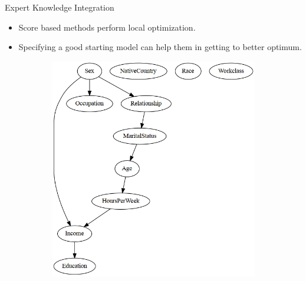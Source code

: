 \documentclass{beamer}
\begin{document}
\begin{frame}{Expert Knowledge Integration}
	\begin{itemize}
		\item Score based methods perform local optimization.
		\item Specifying a good starting model can help them in getting to better 
			optimum.
	\end{itemize}

	\begin{figure}
		\begin{subfigure}{0.5 \textwidth}
		\end{subfigure}%
		\begin{subfigure}{0.5 \textwidth}
			\centering
			\includegraphics[scale=0.3]{imgs/adult_bic_start.png}
		\end{subfigure}
	\end{figure}
\end{frame}
\end{document}
